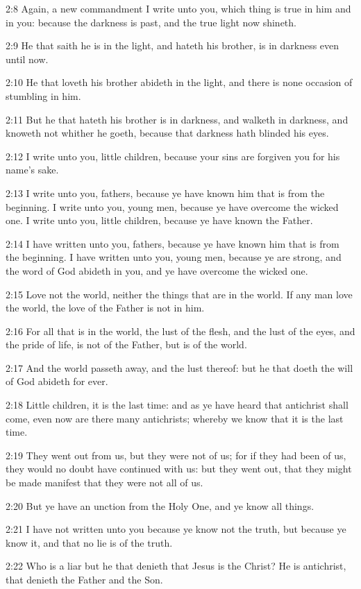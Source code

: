 2:8 Again, a new commandment I write unto you, which thing is true in him and in you: because the darkness is past, and the true light now shineth.

2:9 He that saith he is in the light, and hateth his brother, is in darkness even until now.

2:10 He that loveth his brother abideth in the light, and there is none occasion of stumbling in him.

2:11 But he that hateth his brother is in darkness, and walketh in darkness, and knoweth not whither he goeth, because that darkness hath blinded his eyes.

2:12 I write unto you, little children, because your sins are forgiven you for his name's sake.

2:13 I write unto you, fathers, because ye have known him that is from the beginning. I write unto you, young men, because ye have overcome the wicked one. I write unto you, little children, because ye have known the Father.

2:14 I have written unto you, fathers, because ye have known him that is from the beginning. I have written unto you, young men, because ye are strong, and the word of God abideth in you, and ye have overcome the wicked one.

2:15 Love not the world, neither the things that are in the world. If any man love the world, the love of the Father is not in him.

2:16 For all that is in the world, the lust of the flesh, and the lust of the eyes, and the pride of life, is not of the Father, but is of the world.

2:17 And the world passeth away, and the lust thereof: but he that doeth the will of God abideth for ever.

2:18 Little children, it is the last time: and as ye have heard that antichrist shall come, even now are there many antichrists; whereby we know that it is the last time.

2:19 They went out from us, but they were not of us; for if they had been of us, they would no doubt have continued with us: but they went out, that they might be made manifest that they were not all of us.

2:20 But ye have an unction from the Holy One, and ye know all things.

2:21 I have not written unto you because ye know not the truth, but because ye know it, and that no lie is of the truth.

2:22 Who is a liar but he that denieth that Jesus is the Christ? He is antichrist, that denieth the Father and the Son.

